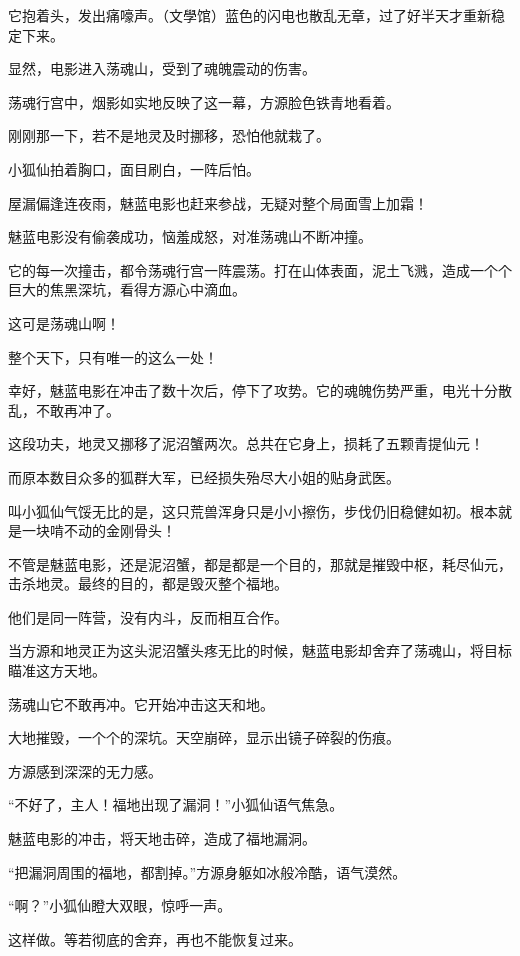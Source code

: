 
\begin{this_body}

它抱着头，发出痛嚎声。（文學馆）蓝色的闪电也散乱无章，过了好半天才重新稳定下来。

显然，电影进入荡魂山，受到了魂魄震动的伤害。

荡魂行宫中，烟影如实地反映了这一幕，方源脸色铁青地看着。

刚刚那一下，若不是地灵及时挪移，恐怕他就栽了。

小狐仙拍着胸口，面目刷白，一阵后怕。

屋漏偏逢连夜雨，魅蓝电影也赶来参战，无疑对整个局面雪上加霜！

魅蓝电影没有偷袭成功，恼羞成怒，对准荡魂山不断冲撞。

它的每一次撞击，都令荡魂行宫一阵震荡。打在山体表面，泥土飞溅，造成一个个巨大的焦黑深坑，看得方源心中滴血。

这可是荡魂山啊！

整个天下，只有唯一的这么一处！

幸好，魅蓝电影在冲击了数十次后，停下了攻势。它的魂魄伤势严重，电光十分散乱，不敢再冲了。

这段功夫，地灵又挪移了泥沼蟹两次。总共在它身上，损耗了五颗青提仙元！

而原本数目众多的狐群大军，已经损失殆尽大小姐的贴身武医。

叫小狐仙气馁无比的是，这只荒兽浑身只是小小擦伤，步伐仍旧稳健如初。根本就是一块啃不动的金刚骨头！

不管是魅蓝电影，还是泥沼蟹，都是都是一个目的，那就是摧毁中枢，耗尽仙元，击杀地灵。最终的目的，都是毁灭整个福地。

他们是同一阵营，没有内斗，反而相互合作。

当方源和地灵正为这头泥沼蟹头疼无比的时候，魅蓝电影却舍弃了荡魂山，将目标瞄准这方天地。

荡魂山它不敢再冲。它开始冲击这天和地。

大地摧毁，一个个的深坑。天空崩碎，显示出镜子碎裂的伤痕。

方源感到深深的无力感。

“不好了，主人！福地出现了漏洞！”小狐仙语气焦急。

魅蓝电影的冲击，将天地击碎，造成了福地漏洞。

“把漏洞周围的福地，都割掉。”方源身躯如冰般冷酷，语气漠然。

“啊？”小狐仙瞪大双眼，惊呼一声。

这样做。等若彻底的舍弃，再也不能恢复过来。


\end{this_body}
